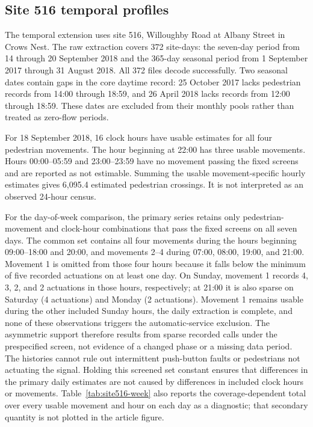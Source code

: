 \documentclass[11pt]{article}
\begin{document}

\subsection*{Site 516 temporal profiles}

The temporal extension uses site 516, Willoughby Road at Albany Street in Crows Nest. The raw extraction covers 372 site-days: the seven-day period from 14 through 20 September 2018 and the 365-day seasonal period from 1 September 2017 through 31 August 2018. All 372 files decode successfully. Two seasonal dates contain gaps in the core daytime record: 25 October 2017 lacks pedestrian records from 14:00 through 18:59, and 26 April 2018 lacks records from 12:00 through 18:59. These dates are excluded from their monthly pools rather than treated as zero-flow periods.

For 18 September 2018, 16 clock hours have usable estimates for all four pedestrian movements. The hour beginning at 22:00 has three usable movements. Hours 00:00--05:59 and 23:00--23:59 have no movement passing the fixed screens and are reported as not estimable. Summing the usable movement-specific hourly estimates gives 6,095.4 estimated pedestrian crossings. It is not interpreted as an observed 24-hour census.

For the day-of-week comparison, the primary series retains only pedestrian-movement and clock-hour combinations that pass the fixed screens on all seven days. The common set contains all four movements during the hours beginning 09:00--18:00 and 20:00, and movements 2--4 during 07:00, 08:00, 19:00, and 21:00. Movement 1 is omitted from those four hours because it falls below the minimum of five recorded actuations on at least one day. On Sunday, movement 1 records 4, 3, 2, and 2 actuations in those hours, respectively; at 21:00 it is also sparse on Saturday (4 actuations) and Monday (2 actuations). Movement 1 remains usable during the other included Sunday hours, the daily extraction is complete, and none of these observations triggers the automatic-service exclusion. The asymmetric support therefore results from sparse recorded calls under the prespecified screen, not evidence of a changed phase or a missing data period. The histories cannot rule out intermittent push-button faults or pedestrians not actuating the signal. Holding this screened set constant ensures that differences in the primary daily estimates are not caused by differences in included clock hours or movements. Table~\ref{tab:site516-week} also reports the coverage-dependent total over every usable movement and hour on each day as a diagnostic; that secondary quantity is not plotted in the article figure.
\end{document}
